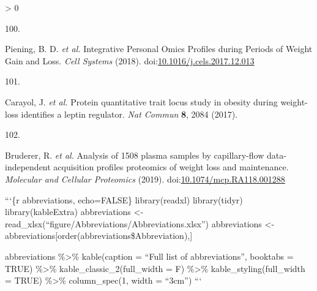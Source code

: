 \documentclass[11pt,twoside]{bristolthesis}
\newlength{\cslhangindent}
\newlength{\csllabelwidth}
\newenvironment{CSLReferences}[2] %
 {%
  \setlength{\parindent}{0pt}
  \ifodd #1 \everypar{\setlength{\hangindent}{\cslhangindent}}\ignorespaces\fi
  \ifnum #2 > 0
  \setlength{\parskip}{#2\baselineskip}
  \fi
 }%
 {}
\newcommand{\CSLLeftMargin}[1]{\parbox[t]{\csllabelwidth}{#1}}
\newcommand{\CSLRightInline}[1]{\parbox[t]{\linewidth - \csllabelwidth}{#1}\break}
\begin{document}
\begin{CSLReferences}{0}{0}
\leavevmode\hypertarget{ref-Piening2018}{}%
\CSLLeftMargin{100. }
\CSLRightInline{Piening, B. D. \emph{et al.} {Integrative Personal Omics Profiles during Periods of Weight Gain and Loss}. \emph{Cell Systems} (2018). doi:\href{https://doi.org/10.1016/j.cels.2017.12.013}{10.1016/j.cels.2017.12.013}}

\leavevmode\hypertarget{ref-Carayol2017}{}%
\CSLLeftMargin{101. }
\CSLRightInline{Carayol, J. \emph{et al.} {Protein quantitative trait locus study in obesity during weight-loss identifies a leptin regulator}. \emph{Nat Commun} \textbf{8}, 2084 (2017).}

\leavevmode\hypertarget{ref-Bruderer2019}{}%
\CSLLeftMargin{102. }
\CSLRightInline{Bruderer, R. \emph{et al.} {Analysis of 1508 plasma samples by capillary-flow data-independent acquisition profiles proteomics of weight loss and maintenance}. \emph{Molecular and Cellular Proteomics} (2019). doi:\href{https://doi.org/10.1074/mcp.RA118.001288}{10.1074/mcp.RA118.001288}}

\end{CSLReferences}
  \begin{abbreviations}
    ```\{r abbreviations, echo=FALSE\}
    library(readxl)
    library(tidyr)
    library(kableExtra)
    abbreviations \textless- read\_xlsx(``figure/Abbreviations/Abbreviations.xlsx'')
    abbreviations \textless- abbreviations{[}order(abbreviations\$Abbreviation),{]}

    abbreviations \%\textgreater\% kable(caption = ``Full list of abbreviations'', booktabs = TRUE) \%\textgreater\%
    kable\_classic\_2(full\_width = F) \%\textgreater\%
    kable\_styling(full\_width = TRUE) \%\textgreater\%
    column\_spec(1, width = ``3cm'')
    ```
  \end{abbreviations}
\end{document}
